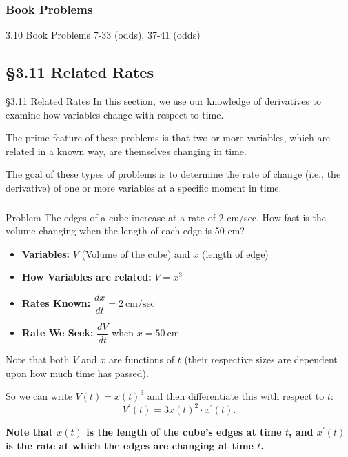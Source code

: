 \documentclass[cal1spr16Lectures.tex]{subfiles}
\begin{document}
\subsubsection{Book Problems}

\begin{frame}
\begin{block}{3.10 Book Problems} 7-33 (odds), 37-41 (odds) \end{block}
\end{frame}

\subsection[3.11 Related Rates]{\S 3.11 Related Rates}

\begin{frame}{\S 3.11 Related Rates}
\small 
In this section, we use our knowledge of derivatives to examine how variables change with respect to time.

\vspace{1pc}
The prime feature of these problems is that two or more variables, which are related in a known way, are themselves changing in time.

\vspace{1pc}
The goal of these types of problems is to determine the rate of change (i.e., the derivative) of one or more variables at a specific moment in time.
\end{frame}

\begin{frame}
\frametitle{}
\begin{block}{Problem}
The edges of a cube increase at a rate of 2 cm/sec.  How fast is the volume changing when the length of each edge is 50 cm?
\end{block}
\small
\begin{itemize}
\item {\bf Variables:}  $V$ (Volume of the cube) and $x$ (length of edge)
\item {\bf How Variables are related:}  $V=x^3$
\item {\bf Rates Known:}  $\dfrac{dx}{dt}=2\ \text{cm/sec}$
\item {\bf Rate We Seek:}  $\dfrac{dV}{dt}$ when $x=50\ \text{cm}$
\end{itemize}
\end{frame}

\begin{frame}
\small
Note that both $V$ and $x$ are functions of $t$ (their respective sizes are dependent upon how much time has passed).

\vspace{1pc}
So we can write $V(t)=x(t)^3$ and then differentiate this with respect to $t$:
$$V^{\prime}(t) = 3 x(t)^2 \cdot x^{\prime}(t).$$

\vspace{1pc}
{\bf Note that $x(t)$ is the length of the cube's edges at time $t$, and $x^{\prime}(t)$ is the rate at which the edges are changing at time $t$.}
\end{frame}
\end{document}
